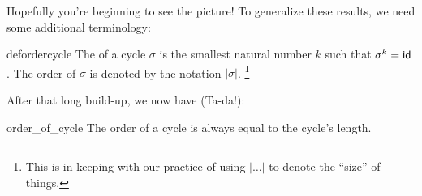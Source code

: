 \noindent
Hopefully you're beginning to see the picture! To generalize these results, we need some additional terminology:

\begin{defn}{defordercycle}
The  of a cycle $\sigma$ is the smallest natural number $k$ such that $\sigma^k = {\sf{i}d}$.   The order of $\sigma$ is denoted by the notation $|\sigma|$.
\footnote{This is in keeping with our practice of using $|\ldots|$ to denote the ``size'' of things.}
\end{defn}
After that long build-up, we now have (Ta-da!):

\begin{prop}{order_of_cycle}
The order of a cycle is always equal to the cycle's length.
\end{prop}



